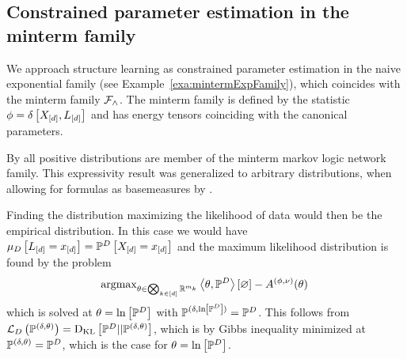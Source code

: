 \begin{remark}
\end{remark}






\subsection{Constrained parameter estimation in the minterm family}

We approach structure learning as constrained parameter estimation in the naive exponential family (see Example~\ref{exa:mintermExpFamily}), which coincides with the minterm family $\mathcal{F}_{\land}$.
The minterm family is defined by the statistic $\phi = \delta\left[X_{[d]}, L_{[d]}\right]$ and has energy tensors coinciding with the canonical parameters.



By  all positive distributions are member of the minterm markov logic network family.
This expressivity result was generalized to arbitrary distributions, when allowing for formulas as basemeasures by .

Finding the distribution maximizing the likelihood of data would then be the empirical distribution.
In this case we would have $\mu_{D}\left[L_{[d]}=x_{[d]}\right] = \mathbb{P}^{D}\left[X_{[d]}=x_{[d]}\right]$ and the maximum likelihood distribution is found by the problem
\begin{align*}
	\mathrm{argmax}_{\theta\in\bigotimes_{k\in[d]} \mathbb{R}^{m_{k}}}  \left\langle \theta,\mathbb{P}^{D}\right\rangle \left[ \varnothing \right] - A^{(\phi,\nu)}(\theta) \, 
\end{align*}
which is solved at $\theta=\ln \left[ \mathbb{P}^{D} \right]$ with $\mathbb{P}^{(\delta,\ln \left[ \mathbb{P}^{D} \right])}= \mathbb{P}^{D}$.
This follows from $\mathcal{L}_{D}\left(\mathbb{P}^{(\delta,\theta)}\right)=\mathrm{D}_{\mathrm{KL}}\left[ \mathbb{P}^{D} || \mathbb{P}^{(\delta,\theta)} \right]$, which is by Gibbs inequality minimized at $\mathbb{P}^{(\delta,\theta)}=\mathbb{P}^{D}$, which is the case for $\theta = \ln \left[ \mathbb{P}^{D} \right]$.

